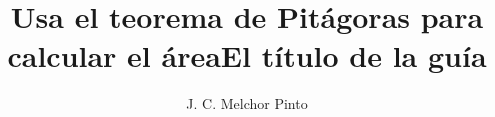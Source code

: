 \documentclass[12pt,addpoints,answers]{guia}
\title{Usa el teorema de Pitágoras para calcular el área}
\title{El título de la guía}
\author{J. C. Melchor Pinto}
\begin{document}
\pagestyle{headandfoot}

\INFO
\printanswers
\vspace{-0.5cm}
\begin{multicols}{2}
    
    
    
    \columnbreak
    
    
\end{multicols}
\begin{questions}
    \questionboxed[10]{}
    \questionboxed[10]{}
    \questionboxed[10]{}
    \questionboxed[10]{}
    \questionboxed[10]{}
    \questionboxed[10]{}
    \questionboxed[10]{}
    \questionboxed[10]{}
    \questionboxed[10]{}
    \questionboxed[10]{}
\end{questions}
\end{document}
